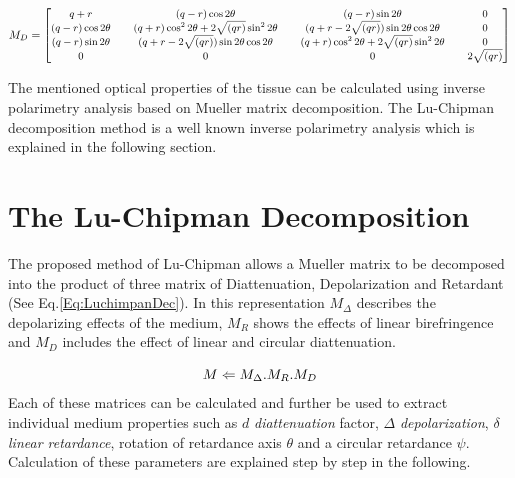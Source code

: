 \documentclass[oneside,a4,12p]{report} %
\begin{document}
\begin{itemize}
	\begin{equation}\label{Eq:LinearDiattenuation}
	\small
	M_{D}=\begin{bmatrix}
	q+r &&  (q-r)\cos 2\theta &&  (q-r)\sin 2\theta && 0\\
	(q-r)\cos 2\theta && (q+r)\cos^{2}2\theta + 2\sqrt{(qr)}\sin^{2}2\theta && (q+r-2\sqrt{(qr)})\sin 2\theta\cos 2\theta & & 0\\ 
	(q-r)\sin 2\theta && (q+r-2\sqrt{(qr)})\sin 2\theta\cos 2\theta && (q+r)\cos^{2}2\theta + 2\sqrt{(qr)}\sin^{2}2\theta && 0\\
	 0 && 0 && 0 && 2\sqrt{(qr)}
	\end{bmatrix}
	\end{equation}		
	\end{itemize}


The mentioned optical properties of the tissue can be calculated using inverse polarimetry analysis based on Mueller matrix decomposition. The Lu-Chipman decomposition method \cite{lu1996interpretation} is a well known inverse polarimetry analysis which is explained in the following section.

\section{The Lu-Chipman Decomposition}
The proposed method of Lu-Chipman \cite{lu1996interpretation} allows a Mueller matrix to be decomposed into the product of three matrix of Diattenuation, Depolarization and Retardant (See Eq.\ref{Eq:LuchimpanDec}). In this representation $M_{\Delta}$ describes the depolarizing effects of the medium, $M_{R}$ shows the effects of linear birefringence and $M_{D}$ includes the effect of linear and circular diattenuation. 

 	\begin{equation}\label{Eq:LuchimpanDec}
	\small
	M\Leftarrow M_{\Delta}.M_{R}.M_{D}
	\end{equation}
Each of these matrices can be calculated and further be used to extract individual medium properties such as $d$ \textit{diattenuation} factor, $\Delta$ \textit{depolarization}, $\delta$ \textit{linear retardance}, rotation of retardance axis $\theta$ and a circular retardance $\psi$. Calculation of these parameters are explained step by step in the following. 
\end{document}
